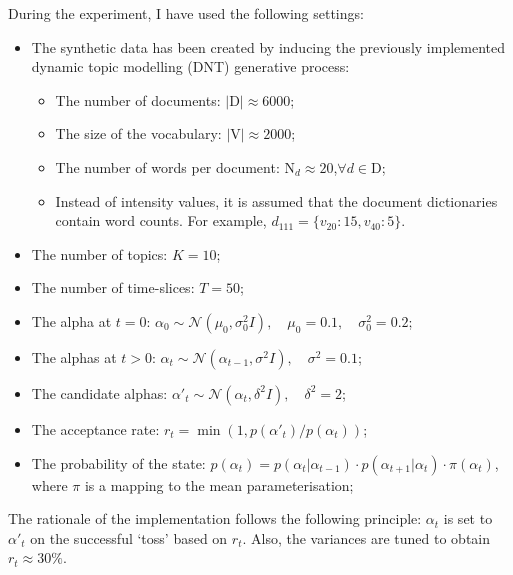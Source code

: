 \documentclass[12pt]{article}
\begin{document}
\par During the experiment, I have used the following settings:
\begin{itemize}
\item The synthetic data has been created by inducing the previously implemented dynamic topic modelling (DNT) generative process:
\begin{itemize}
\item The number of documents: $|\mbox{D}|\approx6000$;
\item The size of the vocabulary: $|\mbox{V}|\approx2000$;
\item The number of words per document: $\mbox{N}_d\approx20$,\quad$\forall d \in \mbox{D}$;
\item Instead of intensity values, it is assumed that the document dictionaries contain word counts. For example, $d_{111}=\{v_{20}:15, v_{40}:5\}$. 
\end{itemize}
\item The number of topics: $K=10$;
\item The number of time-slices: $T=50$;
\item The alpha at $t=0$: $\alpha_0 \sim \mathcal{N}(\mu_0, \sigma^2_0I),\quad \mu_0 = 0.1,\quad\sigma_0^2 = 0.2$;
\item The alphas at $t>0$: $\alpha_t \sim \mathcal{N}(\alpha_{t-1}, \sigma^2I), \quad\sigma^2 = 0.1$;
\item The candidate alphas: $\alpha'_t \sim \mathcal{N}(\alpha_{t}, \delta^2I), \quad\delta^2 = 2$; 
\item The acceptance rate: $r_t=\min(1,p(\alpha'_t)/p(\alpha_t))$;
\item The probability of the state: $p(\alpha_t)=p(\alpha_{t} | \alpha_{t-1})\cdot p(\alpha_{t+1} | \alpha_{t})\cdot \pi(\alpha_t)$, where $\pi$ is a mapping to the mean parameterisation;
\end{itemize}

The rationale of the implementation follows the following principle: $\alpha_t$ is set to $\alpha'_t$ on the successful `toss' based on $r_t$. Also, the variances are tuned to obtain $r_t\approx30\%$.
\end{document}
